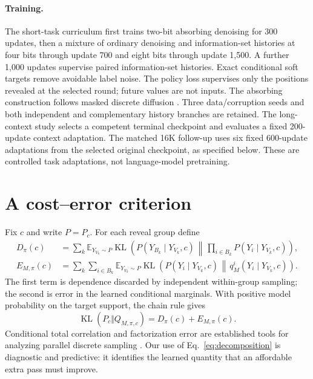 \documentclass{article}
\newcommand{\KL}{\operatorname{KL}}
\newcommand{\E}{\mathbb E}
\begin{document}
\paragraph{Training.}
The short-task curriculum first trains two-bit absorbing denoising for 300
updates, then a mixture of ordinary denoising and information-set histories
at four bits through update 700 and eight bits through update 1,500.
A further 1,000 updates supervise paired information-set histories.
Exact conditional soft targets remove avoidable label noise. The policy loss
supervises only the positions revealed at the selected round; future values
are not inputs. The absorbing construction follows masked discrete diffusion
\citep{d3pm,mdlm}. Three data/corruption seeds and both independent and
complementary history branches are retained. The long-context study selects
a competent terminal checkpoint and evaluates a fixed 200-update context
adaptation. The matched 16K follow-up uses six fixed 600-update adaptations
from the selected original checkpoint, as specified below. These are controlled
task adaptations, not language-model pretraining.

\section{A cost--error criterion}
Fix $c$ and write $P=P_c$. For each reveal group define
\begin{align}
 D_\pi(c)&=\sum_k\E_{Y_{V_k}\sim P}
 \KL\!\left(P(Y_{B_k}\mid Y_{V_k},c)\,\middle\Vert\,
       \prod_{i\in B_k}P(Y_i\mid Y_{V_k},c)\right),\\
 E_{M,\pi}(c)&=\sum_k\sum_{i\in B_k}\E_{Y_{V_k}\sim P}
 \KL\!\left(P(Y_i\mid Y_{V_k},c)\,\middle\Vert\,
       q_M^i(Y_i\mid Y_{V_k},c)\right).
\end{align}
The first term is dependence discarded by independent within-group sampling;
the second is error in the learned conditional marginals. With positive model
probability on the target support, the chain rule gives
\begin{equation}
 \KL(P_c\Vert Q_{M,\pi,c})=D_\pi(c)+E_{M,\pi}(c).
 \label{eq:decomposition}
\end{equation}
Conditional total correlation and factorization error are established tools
for analyzing parallel discrete sampling
\citep{factorization2025,ctcdepth2026,intrinsicdependence2026}.
Our use of Eq.~\eqref{eq:decomposition} is diagnostic and predictive: it identifies
the learned quantity that an affordable extra pass must improve.
\end{document}
